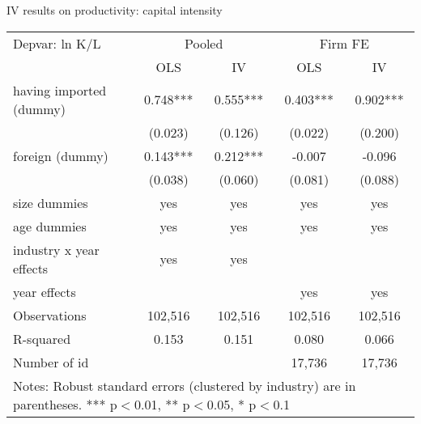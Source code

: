 \documentclass[10pt]{beamer}
\begin{document}
\begin{frame}{IV results on productivity: capital intensity}
\begin{table}
	\renewcommand{\baselinestretch}{1.2}  \scriptsize \centering
	\begin{tabular}{lcccc}
		\hline \hline
		Depvar: ln K/L & \multicolumn{2}{c}{Pooled} & \multicolumn{2}{c}{Firm FE} \\ 
		& OLS   & IV    & OLS   & IV \\ \hline
    	having imported (dummy) & 0.748*** & 0.555*** & 0.403*** & 0.902*** \\
		& (0.023) & (0.126) & (0.022) & (0.200) \\
		foreign (dummy) & 0.143*** & 0.212*** & -0.007 & -0.096 \\
		& (0.038) & (0.060) & (0.081) & (0.088) \\
		size dummies & yes   & yes   & yes   & yes \\
		age dummies & yes   & yes   & yes   & yes \\
		industry x year effects & yes   & yes   &       &  \\
		year effects &       &       & yes   & yes \\
		Observations & 102,516 & 102,516 & 102,516 & 102,516 \\
		R-squared & 0.153 & 0.151 & 0.080 & 0.066 \\
		Number of id &       &       & 17,736 & 17,736 \\
		\hline \hline
		\multicolumn{5}{l}{%
			\begin{minipage}{8cm}
				\scriptsize Notes: Robust standard errors (clustered by industry) are in parentheses. *** p$<$0.01, ** p$<$0.05, * p$<$0.1%
			\end{minipage}%
		}\\
	\end{tabular}%
	\renewcommand{\baselinestretch}{1.62}\normalsize \setlength{\baselineskip}{0.65\baselineskip}
\end{table}
\end{frame}
\end{document}
